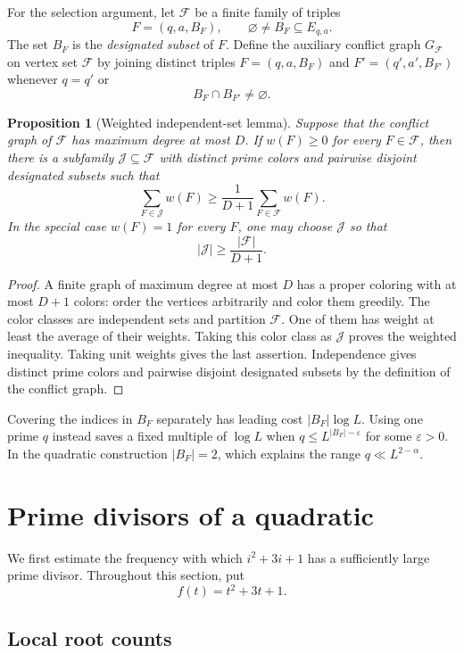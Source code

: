 \documentclass[11pt]{amsart}
\newtheorem{proposition}[theorem]{Proposition}
\theoremstyle{definition}
\theoremstyle{remark}
\begin{document}
For the selection argument, let $\mathcal F$ be a finite family of triples
\[
F=(q,a,B_F),
\qquad
\varnothing\neq B_F\subseteq E_{q,a}.
\]
The set $B_F$ is the \emph{designated subset} of $F$.  Define the auxiliary
conflict graph $G_{\mathcal F}$ on vertex set $\mathcal F$ by joining
distinct triples $F=(q,a,B_F)$ and $F'=(q',a',B_{F'})$ whenever $q=q'$ or
\[
B_F\cap B_{F'}\neq\varnothing.
\]

\begin{proposition}[Weighted independent-set lemma]
\label{prop:conflict-selection}
Suppose that the conflict graph of $\mathcal F$ has maximum degree at most
$D$.  If $w(F)\geq0$ for every $F\in\mathcal F$, then there is a subfamily
$\mathcal J\subseteq\mathcal F$ with distinct prime colors and pairwise
disjoint designated subsets such that
\[
\sum_{F\in\mathcal J}w(F)
\geq\frac1{D+1}\sum_{F\in\mathcal F}w(F).
\]
In the special case $w(F)=1$ for every $F$, one may choose $\mathcal J$ so
that
\[
|\mathcal J|\geq\frac{|\mathcal F|}{D+1}.
\]
\end{proposition}

\begin{proof}
A finite graph of maximum degree at most $D$ has a proper coloring with at
most $D+1$ colors: order the vertices arbitrarily and color them greedily.
The color classes are independent sets and partition $\mathcal F$.  One of
them has weight at least the average of their weights.  Taking this color
class as $\mathcal J$ proves the weighted inequality.  Taking unit weights
gives the last assertion.  Independence gives distinct prime colors and
pairwise disjoint designated subsets by the definition of the conflict graph.
\end{proof}

Covering the indices in $B_F$ separately has leading cost $|B_F|\log L$.
Using one prime $q$ instead saves a fixed multiple of $\log L$ when
$q\leq L^{|B_F|-\varepsilon}$ for some $\varepsilon>0$.  In the quadratic
construction $|B_F|=2$, which explains the range $q\ll L^{2-\alpha}$.

\section{Prime divisors of a quadratic}

We first estimate the frequency with which $i^2+3i+1$ has a sufficiently
large prime divisor.  Throughout this section, put
\[
f(t)=t^2+3t+1.
\]

\subsection{Local root counts}
\end{document}

